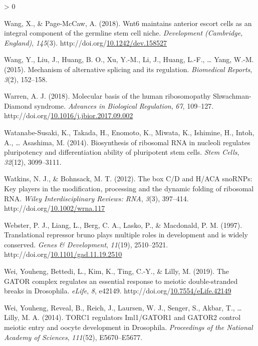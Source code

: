 \documentclass[12pt,oneside]{reedthesis}
\newlength{\cslhangindent}
\newenvironment{CSLReferences}[2] %
 {%
  \setlength{\parindent}{0pt}
  \ifodd #1 \everypar{\setlength{\hangindent}{\cslhangindent}}\ignorespaces\fi
  \ifnum #2 > 0
  \setlength{\parskip}{#2\baselineskip}
  \fi
 }%
 {}
\begin{document}
\begin{CSLReferences}{1}{0}
\leavevmode\hypertarget{ref-wangWnt6MaintainsAnterior2018}{}%
Wang, X., \& Page-McCaw, A. (2018). Wnt6 maintains anterior escort cells as an integral component of the germline stem cell niche. \emph{Development (Cambridge, England)}, \emph{145}(3). http://doi.org/\href{https://doi.org/10.1242/dev.158527}{10.1242/dev.158527}

\leavevmode\hypertarget{ref-Wang2015a}{}%
Wang, Y., Liu, J., Huang, B. O., Xu, Y.-M., Li, J., Huang, L.-F., \ldots{} Yang, W.-M. (2015). Mechanism of alternative splicing and its regulation. \emph{Biomedical Reports}, \emph{3}(2), 152--158.

\leavevmode\hypertarget{ref-warrenMolecularBasisHuman2018}{}%
Warren, A. J. (2018). Molecular basis of the human ribosomopathy {Shwachman-Diamond} syndrome. \emph{Advances in Biological Regulation}, \emph{67}, 109--127. http://doi.org/\href{https://doi.org/10.1016/j.jbior.2017.09.002}{10.1016/j.jbior.2017.09.002}

\leavevmode\hypertarget{ref-WatanabeSusaki2014a}{}%
Watanabe-Susaki, K., Takada, H., Enomoto, K., Miwata, K., Ishimine, H., Intoh, A., \ldots{} Asashima, M. (2014). Biosynthesis of ribosomal {RNA} in nucleoli regulates pluripotency and differentiation ability of pluripotent stem cells. \emph{Stem Cells}, \emph{32}(12), 3099--3111.

\leavevmode\hypertarget{ref-Watkins2012b}{}%
Watkins, N. J., \& Bohnsack, M. T. (2012). The box {C}/{D} and {H}/{ACA snoRNPs}: {Key} players in the modification, processing and the dynamic folding of ribosomal {RNA}. \emph{Wiley Interdisciplinary Reviews: RNA}, \emph{3}(3), 397--414. http://doi.org/\href{https://doi.org/10.1002/wrna.117}{10.1002/wrna.117}

\leavevmode\hypertarget{ref-Webster1997a}{}%
Webster, P. J., Liang, L., Berg, C. A., Lasko, P., \& Macdonald, P. M. (1997). Translational repressor bruno plays multiple roles in development and is widely conserved. \emph{Genes \& Development}, \emph{11}(19), 2510--2521. http://doi.org/\href{https://doi.org/10.1101/gad.11.19.2510}{10.1101/gad.11.19.2510}

\leavevmode\hypertarget{ref-Wei2018a}{}%
Wei, Youheng, Bettedi, L., Kim, K., Ting, C.-Y., \& Lilly, M. (2019). The {GATOR} complex regulates an essential response to meiotic double-stranded breaks in {Drosophila}. \emph{eLife}, \emph{8}, e42149. http://doi.org/\href{https://doi.org/10.7554/eLife.42149}{10.7554/eLife.42149}

\leavevmode\hypertarget{ref-Wei2014b}{}%
Wei, Youheng, Reveal, B., Reich, J., Laursen, W. J., Senger, S., Akbar, T., \ldots{} Lilly, M. A. (2014). {TORC1} regulators {Iml1}/{GATOR1} and {GATOR2} control meiotic entry and oocyte development in {Drosophila}. \emph{Proceedings of the National Academy of Sciences}, \emph{111}(52), E5670--E5677.


\end{CSLReferences}
\end{document}
